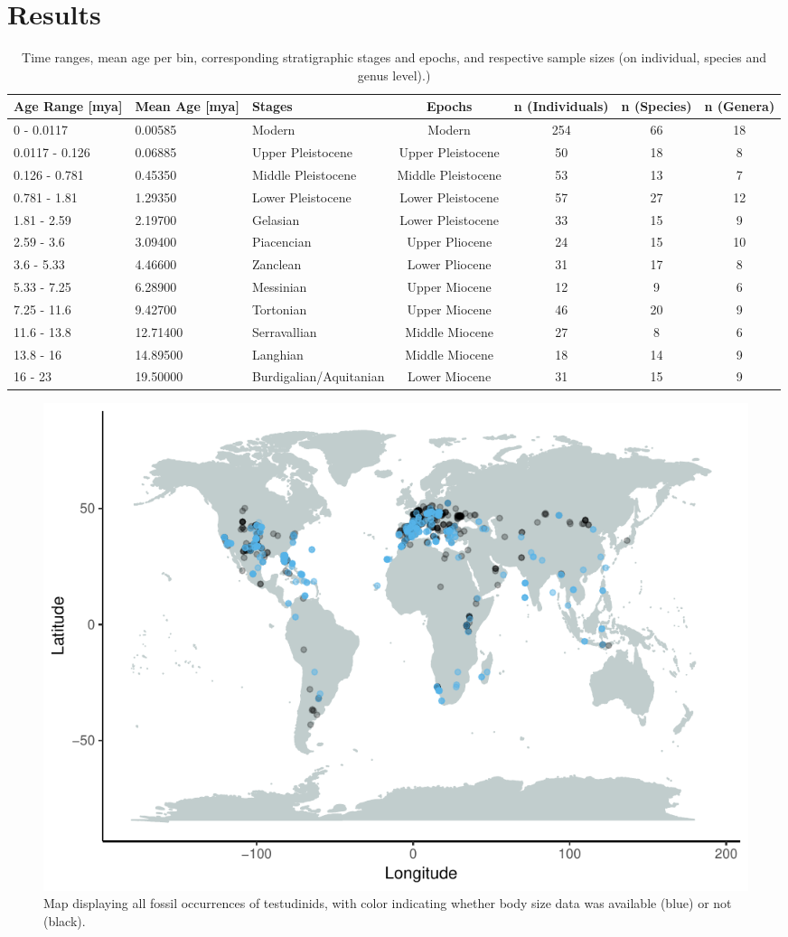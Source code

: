 \section{Results}

\begin{landscape}\label{data}
\begin{longtable}[]{@{}lllcccc@{}}
	\caption{Time ranges, mean age per bin, corresponding stratigraphic stages and epochs, and respective sample sizes (on individual, species and genus level).)}
	\label{tab:bins}\tabularnewline
	\toprule
	Age Range [mya] & Mean Age [mya] & Stages & Epochs & n (Individuals) & n (Species) & n (Genera)\tabularnewline
	\midrule
	\endhead
	0 - 0.0117 & 0.00585 & Modern & Modern & 254 & 66 & 18\tabularnewline
	0.0117 - 0.126 & 0.06885 & Upper Pleistocene & Upper Pleistocene & 50
	& 18 & 8\tabularnewline
	0.126 - 0.781 & 0.45350 & Middle Pleistocene & Middle Pleistocene & 53
	& 13 & 7\tabularnewline
	0.781 - 1.81 & 1.29350 & Lower Pleistocene & Lower Pleistocene & 57 &
	27 & 12\tabularnewline
	1.81 - 2.59 & 2.19700 & Gelasian & Lower Pleistocene & 33 & 15 &
	9\tabularnewline
	2.59 - 3.6 & 3.09400 & Piacencian & Upper Pliocene & 24 & 15 &
	10\tabularnewline
	3.6 - 5.33 & 4.46600 & Zanclean & Lower Pliocene & 31 & 17 &
	8\tabularnewline
	5.33 - 7.25 & 6.28900 & Messinian & Upper Miocene & 12 & 9 &
	6\tabularnewline
	7.25 - 11.6 & 9.42700 & Tortonian & Upper Miocene & 46 & 20 &
	9\tabularnewline
	11.6 - 13.8 & 12.71400 & Serravallian & Middle Miocene & 27 & 8 &
	6\tabularnewline
	13.8 - 16 & 14.89500 & Langhian & Middle Miocene & 18 & 14 &
	9\tabularnewline
	16 - 23 & 19.50000 & Burdigalian/Aquitanian & Lower Miocene & 31 & 15 & 9\tabularnewline
	\bottomrule
\end{longtable}
\end{landscape}



\begin{figure}[htbp]
	\centering
	\includegraphics{MA_JJ_files/figure-latex/MapFossilOccurrences-1.pdf}
	\caption{Map displaying all fossil occurrences of testudinids, with
		color indicating whether body size data was available (blue) or not (black).}
\end{figure}




